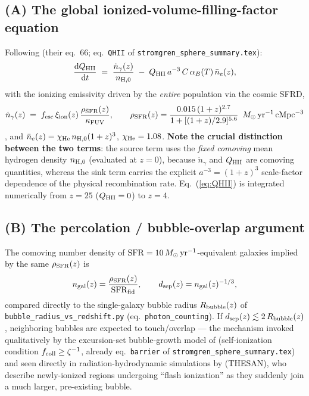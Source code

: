\documentclass[11pt,a4paper]{article}
\newcommand{\Msun}{\,M_\odot}
\begin{document}
\subsection{(A) The global ionized-volume-filling-factor equation}
Following \citet{Choudhury2022} (their eq.~66; eq.~\texttt{QHII} of \texttt{stromgren\_sphere\_summary.tex}):
\begin{equation}
  \frac{\mathrm{d}Q_{\rm HII}}{\mathrm{d}t} \;=\; \frac{\dot n_\gamma(z)}{n_{{\rm H},0}}
  \;-\; Q_{\rm HII}\,a^{-3}\,C\,\alpha_B(T)\,\bar n_e(z),
  \label{eq:QHII}
\end{equation}
with the ionizing emissivity driven by the \emph{entire} population via the cosmic SFRD,
\begin{equation}
  \dot n_\gamma(z) \;=\; f_{\rm esc}\,\xi_{\rm ion}(z)\,\frac{\rho_{\rm SFR}(z)}{\kappa_{\rm FUV}}, \qquad
  \rho_{\rm SFR}(z) = \frac{0.015\,(1+z)^{2.7}}{1+[(1+z)/2.9]^{5.6}}\ \Msun\,{\rm yr^{-1}\,cMpc^{-3}}
  \label{eq:rhoSFR}
\end{equation}
\citep{MadauDickinson2014}, and $\bar n_e(z)=\chi_{\rm He}\,n_{{\rm H},0}(1+z)^3$, $\chi_{\rm He}=1.08$.
\textbf{Note the crucial distinction between the two terms}: the source term uses the \emph{fixed comoving}
mean hydrogen density $n_{{\rm H},0}$ (evaluated at $z=0$), because $\dot n_\gamma$ and $Q_{\rm HII}$ are
comoving quantities, whereas the sink term carries the explicit $a^{-3}=(1+z)^3$ scale-factor dependence of
the physical recombination rate. Eq.~(\ref{eq:QHII}) is integrated numerically from $z=25$ ($Q_{\rm HII}=0$)
to $z=4$.

\subsection{(B) The percolation / bubble-overlap argument}
The comoving number density of $\mathrm{SFR}=10\Msun\,{\rm yr^{-1}}$-equivalent galaxies implied by the same
$\rho_{\rm SFR}(z)$ is
\begin{equation}
  n_{\rm gal}(z) = \frac{\rho_{\rm SFR}(z)}{\mathrm{SFR}_{\rm fid}}, \qquad
  d_{\rm sep}(z) = n_{\rm gal}(z)^{-1/3},
  \label{eq:sep}
\end{equation}
compared directly to the single-galaxy bubble radius $R_{\rm bubble}(z)$ of
\texttt{bubble\_radius\_vs\_redshift.py} (eq.~\texttt{photon\_counting}). If $d_{\rm sep}(z)\lesssim
2\,R_{\rm bubble}(z)$, neighboring bubbles are expected to touch/overlap --- the mechanism invoked
qualitatively by the excursion-set bubble-growth model of \citet{Furlanetto2004} (self-ionization condition
$f_{\rm coll}\ge\zeta^{-1}$, already eq.~\texttt{barrier} of \texttt{stromgren\_sphere\_summary.tex}) and seen
directly in radiation-hydrodynamic simulations by \citet{Neyer2023} (THESAN), who describe newly-ionized
regions undergoing ``flash ionization'' as they suddenly join a much larger, pre-existing bubble.
\end{document}
